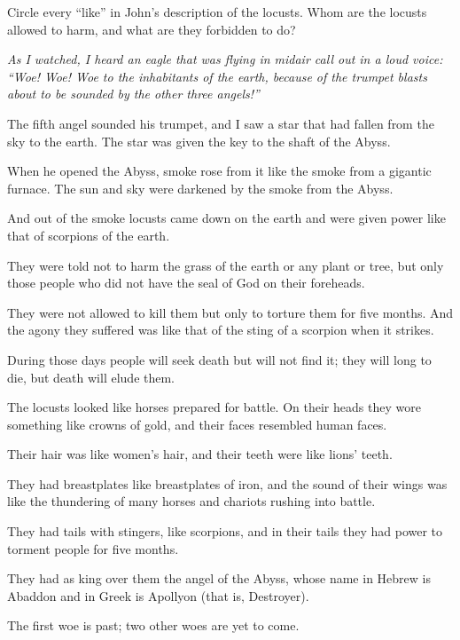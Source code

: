 \begin{ScriptureBox2}{Circle every ``like'' in John's description of the locusts. Whom are the locusts allowed to harm, and what are they forbidden to do?}

\item[8:13] \textit{As I watched, I heard an eagle that was flying in midair call out in a loud voice: “Woe! Woe! Woe to the inhabitants of the earth, because of the trumpet blasts about to be sounded by the other three angels!”}

\item[9:1] The fifth angel sounded his trumpet, and I saw a star that had fallen from the sky to the earth. The star was given the key to the shaft of the Abyss.

\item[9:2] When he opened the Abyss, smoke rose from it like the smoke from a gigantic furnace. The sun and sky were darkened by the smoke from the Abyss.

\item[9:3] And out of the smoke locusts came down on the earth and were given power like that of scorpions of the earth.

\item[9:4] They were told not to harm the grass of the earth or any plant or tree, but only those people who did not have the seal of God on their foreheads.

\item[9:5] They were not allowed to kill them but only to torture them for five months. And the agony they suffered was like that of the sting of a scorpion when it strikes.

\item[9:6] During those days people will seek death but will not find it; they will long to die, but death will elude them.

\item[9:7] The locusts looked like horses prepared for battle. On their heads they wore something like crowns of gold, and their faces resembled human faces.

\item[9:8] Their hair was like women's hair, and their teeth were like lions' teeth.

\item[9:9] They had breastplates like breastplates of iron, and the sound of their wings was like the thundering of many horses and chariots rushing into battle.

\item[9:10] They had tails with stingers, like scorpions, and in their tails they had power to torment people for five months.

\item[9:11] They had as king over them the angel of the Abyss, whose name in Hebrew is Abaddon and in Greek is Apollyon (that is, Destroyer).

\item[9:12] The first woe is past; two other woes are yet to come.

\end{ScriptureBox2}

